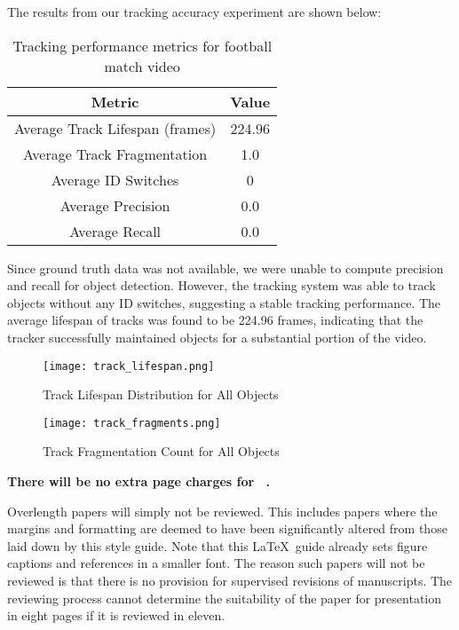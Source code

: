 The results from our tracking accuracy experiment are shown below:

\begin{table}[h]
    \centering
    \begin{tabular}{|c|c|}
    \hline
    \textbf{Metric} & \textbf{Value} \\
    \hline
    Average Track Lifespan (frames) & 224.96 \\
    Average Track Fragmentation & 1.0 \\
    Average ID Switches & 0 \\
    Average Precision & 0.0 \\
    Average Recall & 0.0 \\
    \hline
    \end{tabular}
    \caption{Tracking performance metrics for football match video}
    \label{tab:tracking_accuracy_metrics}
\end{table}

Since ground truth data was not available, we were unable to compute precision and recall for object detection. However, the tracking system was able to track objects without any ID switches, suggesting a stable tracking performance. The average lifespan of tracks was found to be 224.96 frames, indicating that the tracker successfully maintained objects for a substantial portion of the video.

\begin{figure}[ht]
    \centering
    \texttt{[image: track\_lifespan.png]}
    \caption{Track Lifespan Distribution for All Objects}
    \label{fig:track_lifespan}
\end{figure}

\begin{figure}[ht]
    \centering
    \texttt{[image: track\_fragments.png]}
    \caption{Track Fragmentation Count for All Objects}
    \label{fig:track_fragments}
\end{figure}


{\bf There will be no extra page charges for \confName\ \confYear.}

Overlength papers will simply not be reviewed.
This includes papers where the margins and formatting are deemed to have been significantly altered from those laid down by this style guide.
Note that this \LaTeX\ guide already sets figure captions and references in a smaller font.
The reason such papers will not be reviewed is that there is no provision for supervised revisions of manuscripts.
The reviewing process cannot determine the suitability of the paper for presentation in eight pages if it is reviewed in eleven.


